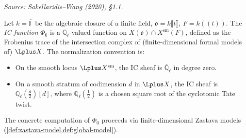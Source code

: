 \begin{definition}[IC function]
  \label{def:IC-function}
%
  \textit{Source: Sakellaridis--Wang (2020), §1.1.}

  Let \( k = \overline{\mathbb{F}} \) be the algebraic closure of a finite field,
  \( \mathfrak{o} = k\llbracket t \rrbracket \), \( F = k(\!(t)\!) \).
  The \emph{IC function} \( \Phi_0 \) is a \( \overline{\mathbb{Q}}_\ell \)-valued function
  on \( X(\mathfrak{o}) \cap X^{\mathrm{sm}}(F) \), defined as the Frobenius trace of the
  intersection complex of (finite-dimensional formal models of) \( \Lplus X \).
  The normalization convention is:
  \begin{itemize}
    \item On the smooth locus \( \Lplus X^{\mathrm{sm}} \), the IC sheaf is
          \( \overline{\mathbb{Q}}_\ell \) in degree zero.
    \item On a smooth stratum of codimension \( d \) in \( \Lplus X \), the IC sheaf is
          \( \overline{\mathbb{Q}}_\ell(\tfrac{d}{2})[d] \), where
          \( \overline{\mathbb{Q}}_\ell(\tfrac{1}{2}) \) is a chosen square root of the
          cyclotomic Tate twist.
  \end{itemize}
  The concrete computation of \( \Phi_0 \) proceeds via finite-dimensional Zastava models
  (\cref{def:zastava-model,def:global-model}).
\end{definition}

